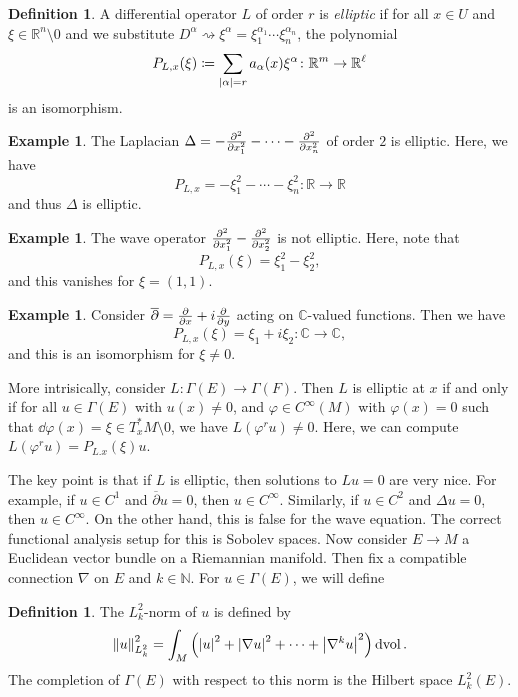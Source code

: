 \documentclass[leqno, openany]{memoir}
\theoremstyle{definition}
\newtheorem{defn}[thm]{Definition}
\newtheorem{exm}[thm]{Example}
\theoremstyle{remark}
\theoremstyle{plain}
\theoremstyle{definition}
\theoremstyle{remark}
\newcommand{\N}{\mathbb{N}}
\newcommand{\R}{\mathbb{R}}
\newcommand{\C}{\mathbb{C}}
\newcommand{\mr}[1]{\mathrm{#1}}
\newcommand{\ol}[1]{\overline{#1}}
\begin{document}
\begin{defn}
    A differential operator $L$ of order $r$ is \textit{elliptic} if for all $x \in U$ and $\xi \in \R^n \setminus \qty{0}$ and we substitute $D^{\alpha} \rightsquigarrow \xi^{\alpha} = \xi_1^{\alpha_1} \cdots \xi_n^{\alpha_n}$, the polynomial
    \[ P_{L, x}(\xi) \coloneqq \sum_{\abs{\alpha} = r} a_{\alpha}(x) \xi^{\alpha} \colon \R^m \to \R^{\ell} \]
    is an isomorphism.
\end{defn}

\begin{exm}
    The Laplacian $\Delta = -\pdv[2]{x_1} - \cdots - \pdv[2]{x_n}$ of order $2$ is elliptic. Here, we have
    \[ P_{L,x} = - \xi_1^2 - \cdots - \xi_n^2 \colon \R \to \R \]
    and thus $\Delta$ is elliptic.
\end{exm}

\begin{exm}
    The wave operator $\pdv[2]{x_1} - \pdv[2]{x_2}$ is not elliptic. Here, note that
    \[ P_{L, x}(\xi) = \xi_1^2 - \xi_2^2, \]
    and this vanishes for $\xi = (1,1)$. 
\end{exm}

\begin{exm}
    Consider $\ol{\partial} = \pdv{x} + i \pdv{y}$ acting on $\C$-valued functions. Then we have
    \[ P_{L, x}(\xi) = \xi_1 + i \xi_2 \colon \C \to \C, \]
    and this is an isomorphism for $\xi \neq 0$.
\end{exm}

More intrisically, consider $L \colon \Gamma(E) \to \Gamma(F)$. Then $L$ is elliptic at $x$ if and only if for all $u \in \Gamma(E)$ with $u(x) \neq 0$, and $\varphi \in C^{\infty}(M)$ with $\varphi(x) = 0$ such that $\dd{\varphi(x)} = \xi \in T_x^*M \setminus \qty{0}$, we have $L(\varphi^r u) \neq 0$. Here, we can compute $L(\varphi^r u) = P_{L.x}(\xi) u$.

The key point is that if $L$ is elliptic, then solutions to $Lu = 0$ are very nice. For example, if $u \in C^1$ and $\ol{\partial} u = 0$, then $u \in C^{\infty}$. Similarly, if $u \in C^2$ and $\Delta u = 0$, then $u \in C^{\infty}$. On the other hand, this is false for the wave equation. The correct functional analysis setup for this is Sobolev spaces. Now consider $E \to M$ a Euclidean vector bundle on a Riemannian manifold. Then fix a compatible connection $\nabla$ on $E$ and $k \in \N$. For $u \in \Gamma(E)$, we will define

\begin{defn}
    The $L^2_k$-norm of $u$ is defined by 
    \[ \norm{u}_{L^2_k}^2 = \int_M \qty(\abs{u}^2 + \abs{\nabla u}^2 + \cdots + \abs{\nabla^k u}^2) \dd{\mr{vol}}. \]
    The completion of $\Gamma(E)$ with respect to this norm is the Hilbert space $L^2_k(E)$.
\end{defn}
\end{document}
